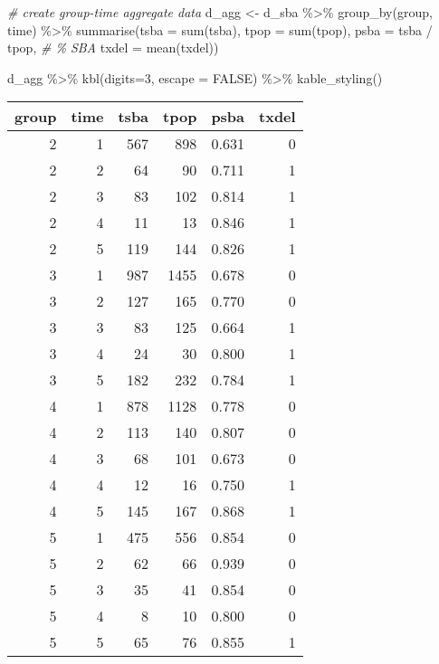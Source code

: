 \documentclass[
]{article}
\newenvironment{Shaded}{\begin{snugshade}}{\end{snugshade}}
\newcommand{\AttributeTok}[1]{\textcolor[rgb]{0.77,0.63,0.00}{#1}}
\newcommand{\CommentTok}[1]{\textcolor[rgb]{0.56,0.35,0.01}{\textit{#1}}}
\newcommand{\ConstantTok}[1]{\textcolor[rgb]{0.00,0.00,0.00}{#1}}
\newcommand{\DecValTok}[1]{\textcolor[rgb]{0.00,0.00,0.81}{#1}}
\newcommand{\FunctionTok}[1]{\textcolor[rgb]{0.00,0.00,0.00}{#1}}
\newcommand{\NormalTok}[1]{#1}
\newcommand{\OtherTok}[1]{\textcolor[rgb]{0.56,0.35,0.01}{#1}}
\newcommand{\SpecialCharTok}[1]{\textcolor[rgb]{0.00,0.00,0.00}{#1}}
\begin{document}
\begin{Shaded}
\begin{Highlighting}[]
\CommentTok{\# create group{-}time aggregate data}
\NormalTok{d\_agg }\OtherTok{\textless{}{-}}\NormalTok{ d\_sba }\SpecialCharTok{\%\textgreater{}\%} \FunctionTok{group\_by}\NormalTok{(group, time) }\SpecialCharTok{\%\textgreater{}\%}
  \FunctionTok{summarise}\NormalTok{(}\AttributeTok{tsba =} \FunctionTok{sum}\NormalTok{(tsba),}
         \AttributeTok{tpop =} \FunctionTok{sum}\NormalTok{(tpop),}
         \AttributeTok{psba =}\NormalTok{ tsba }\SpecialCharTok{/}\NormalTok{ tpop, }\CommentTok{\# \% SBA}
         \AttributeTok{txdel =} \FunctionTok{mean}\NormalTok{(txdel))}

\NormalTok{d\_agg }\SpecialCharTok{\%\textgreater{}\%}
  \FunctionTok{kbl}\NormalTok{(}\AttributeTok{digits=}\DecValTok{3}\NormalTok{, }\AttributeTok{escape =} \ConstantTok{FALSE}\NormalTok{) }\SpecialCharTok{\%\textgreater{}\%}
  \FunctionTok{kable\_styling}\NormalTok{()}
\end{Highlighting}
\end{Shaded}

\begin{table}
\centering
\begin{tabular}[t]{r|r|r|r|r|r}
\hline
group & time & tsba & tpop & psba & txdel\\
\hline
2 & 1 & 567 & 898 & 0.631 & 0\\
\hline
2 & 2 & 64 & 90 & 0.711 & 1\\
\hline
2 & 3 & 83 & 102 & 0.814 & 1\\
\hline
2 & 4 & 11 & 13 & 0.846 & 1\\
\hline
2 & 5 & 119 & 144 & 0.826 & 1\\
\hline
3 & 1 & 987 & 1455 & 0.678 & 0\\
\hline
3 & 2 & 127 & 165 & 0.770 & 0\\
\hline
3 & 3 & 83 & 125 & 0.664 & 1\\
\hline
3 & 4 & 24 & 30 & 0.800 & 1\\
\hline
3 & 5 & 182 & 232 & 0.784 & 1\\
\hline
4 & 1 & 878 & 1128 & 0.778 & 0\\
\hline
4 & 2 & 113 & 140 & 0.807 & 0\\
\hline
4 & 3 & 68 & 101 & 0.673 & 0\\
\hline
4 & 4 & 12 & 16 & 0.750 & 1\\
\hline
4 & 5 & 145 & 167 & 0.868 & 1\\
\hline
5 & 1 & 475 & 556 & 0.854 & 0\\
\hline
5 & 2 & 62 & 66 & 0.939 & 0\\
\hline
5 & 3 & 35 & 41 & 0.854 & 0\\
\hline
5 & 4 & 8 & 10 & 0.800 & 0\\
\hline
5 & 5 & 65 & 76 & 0.855 & 1\\
\hline
\end{tabular}
\end{table}
\end{document}
